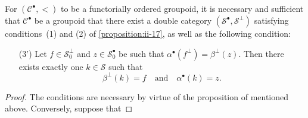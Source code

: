 \documentclass[a4paper,fleqn]{article}
\theoremstyle{plain}
\newenvironment{proposition}[1]
  {\renewcommand\theinnerproposition{#1}\innerproposition}
  {\endinnerproposition}
\theoremstyle{definition}
\newcommand{\oldpage}[1]{{\marginpar{\footnotesize$\bigg\vert$\,\,\,\,\textit{p.~#1}}}}
\newcommand{\textand}{\quad\text{and}\quad}
\newcommand{\CC}{\mathcal{C}}
\renewcommand{\SS}{\mathcal{S}}
\begin{document}
\begin{proposition}{20}
\label{proposition:ii-20}
  For $(\CC^\bullet,<)$ to be a functorially ordered groupoid, it is necessary and sufficient that $\CC^\bullet$ be a groupoid that there exist a double category $(\SS^\bullet,\SS^\perp)$ satisfying conditions~(1) and (2) of \cref{proposition:ii-17}, as well as the following condition:
  \begin{enumerate}
    \item[\normalfont(3')]
      Let $f\in\SS_0^\perp$ and $z\in\SS_0^\bullet$ be such that $\alpha^\bullet(f^\perp)=\beta^\perp(z)$.
      Then there exists exactly one $k\in\SS$ such that
      \[
        \beta^\perp(k)=f
        \textand
        \alpha^\bullet(k)=z.
      \]
  \end{enumerate}
\end{proposition}

\begin{proof}
  \oldpage{75}
  The conditions are necessary by virtue of the proposition of \cite{3a} mentioned above.
  Conversely, suppose that
\end{proof}






\nocite{*}

\begingroup
\let\clearpage\relax
  \printbibliography[keyword={orig},heading=bibintoc,title=Bibliography]
  \printbibliography[keyword={oc},title={Citations to the collected works}]
  \printbibliography[keyword={comm},title={Citations from comments in the collected works}]
\endgroup
\end{document}
